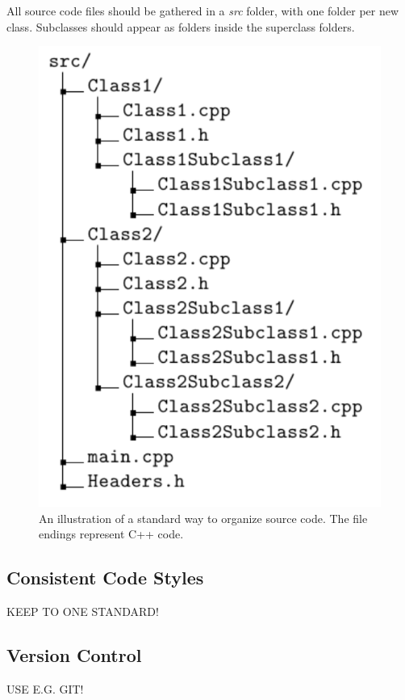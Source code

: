 All source code files should be gathered in a \textit{src} folder, with one folder per new class. Subclasses should appear as folders inside the superclass folders. 

\begin{figure}
 \label{FIG:SRCdirTree}
 \begin{center}
  \includegraphics[scale=0.6]{../Graphics/SRCfolderStruct.pdf} 
 \end{center}
 \caption{An illustration of a standard way to organize source code. The file endings represent C++ code.}
\end{figure}


\subsection{Consistent Code Styles}

KEEP TO ONE STANDARD!

\subsection{Version Control}

USE E.G. GIT!